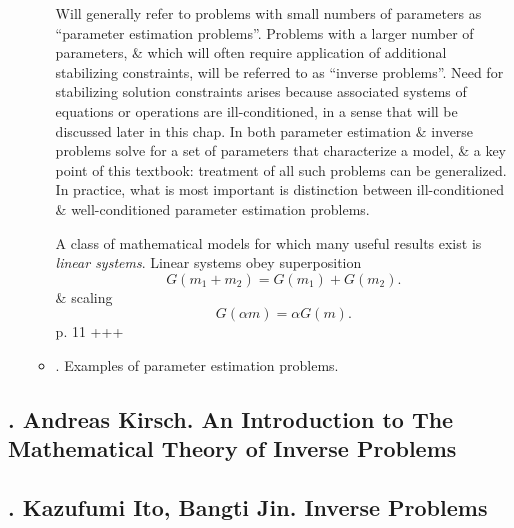\documentclass{article}
\begin{document}
\begin{itemize}
\begin{itemize}
		Will generally refer to problems with small numbers of parameters as ``parameter estimation problems''. Problems with a larger number of parameters, \& which will often require application of additional stabilizing constraints, will be referred to as ``inverse problems''. Need for stabilizing solution constraints arises because associated systems of equations or operations are ill-conditioned, in a sense that will be discussed later in this chap. In both parameter estimation \& inverse problems solve for a set of parameters that characterize a model, \& a key point of this textbook: treatment of all such problems can be generalized. In practice, what is most important is distinction between ill-conditioned \& well-conditioned parameter estimation problems.
		
		A class of mathematical models for which many useful results exist is {\it linear systems}. Linear systems obey superposition
		\begin{equation*}
			G(m_1 + m_2) = G(m_1) + G(m_2).
		\end{equation*}
		\& scaling
		\begin{equation*}
			G(\alpha m) = \alpha G(m).
		\end{equation*}
		p. 11 +++
		\item {. Examples of parameter estimation problems.}
	\end{itemize}
\end{itemize}


\subsection{\cite{Kirsch2021}. {\sc Andreas Kirsch}. An Introduction to The Mathematical Theory of Inverse Problems}


\subsection{\cite{Ito_Jin2015}. {\sc Kazufumi Ito, Bangti Jin}. Inverse Problems}
\end{document}
